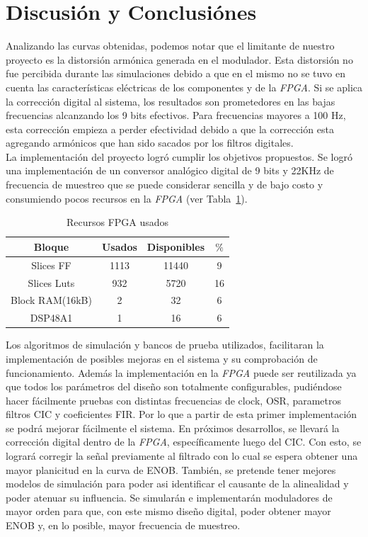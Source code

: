 \documentclass[a4paper,conference]{IEEEtran}
\begin{document}
\section{Discusión y Conclusi\'ones}
Analizando las curvas obtenidas, podemos notar que el limitante de nuestro proyecto es la distorsión armónica generada en el modulador. Esta distorsión no fue percibida durante las simulaciones debido a que en el mismo no se tuvo en cuenta las características eléctricas de los componentes y de la \textit{FPGA}. Si se aplica la corrección digital al sistema, los resultados son prometedores en las bajas frecuencias alcanzando los 9 bits efectivos. Para frecuencias mayores a 100 Hz, esta corrección empieza a perder efectividad debido a que la corrección esta agregando armónicos que han sido sacados por los filtros digitales.\\
La implementación del proyecto logr\'o cumplir los objetivos propuestos. Se logr\'o una implementaci\'on de un conversor analógico digital de 9 bits y 22KHz de frecuencia de muestreo que se puede considerar sencilla y de bajo costo y consumiendo pocos recursos en la \textit{FPGA} (ver Tabla~\ref{Tabla:rescursos}). 
\begin{table}[!t]
	\renewcommand{\arraystretch}{1.3}
	\caption{Recursos FPGA usados}
	\label{Tabla:rescursos}
	\centering
	\begin{tabular}{|c|c|c|c|}
		\hline
		Bloque & Usados & Disponibles & $\%$ \\
		\hline
		Slices FF & 1113 & 11440 & 9\\
		\hline
		Slices Luts & 932 & 5720 & 16\\
		\hline
		Block RAM(16kB) & 2 & 32 & 6\\
		\hline
		DSP48A1 & 1 & 16 & 6\\
		\hline
	\end{tabular}
\end{table}
Los algoritmos de simulaci\'on y bancos de prueba utilizados, facilitaran la implementaci\'on de posibles mejoras en el sistema y su comprobación de funcionamiento. Además la implementación en la \textit{FPGA} puede ser reutilizada ya que todos los parámetros del diseño son totalmente configurables, pudiéndose hacer fácilmente pruebas con distintas frecuencias de clock, OSR, parametros filtros CIC y coeficientes FIR. Por lo que a partir de esta primer implementaci\'on se podrá mejorar fácilmente el sistema.
 En próximos desarrollos, se llevará  la corrección digital dentro de la \textit{FPGA}, específicamente luego del CIC. Con esto, se logrará corregir la señal previamente al filtrado con lo cual se espera obtener una mayor planicitud en la curva de ENOB. También, se pretende tener mejores modelos de simulación para poder asi identificar el causante de la alinealidad y poder atenuar su influencia. Se simularán e implementarán moduladores de mayor orden para que, con este mismo diseño digital, poder obtener mayor ENOB y, en lo posible, mayor frecuencia de muestreo.  
\end{document}
